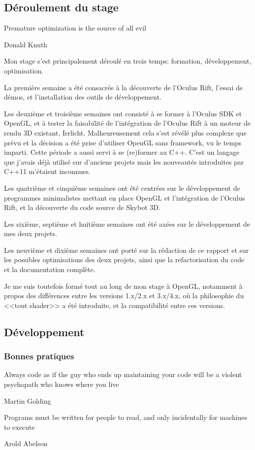 \documentclass[a4paper,french,12pt]{article}
\begin{document}
	\subsection{Déroulement du stage}

	   \epigraph{Premature optimization is the source of all evil}{Donald Knuth}

		Mon stage s'est principalement déroulé en trois temps: formation, développement, optimisation.

		La première semaine a été consacrée à la découverte de l'Oculus Rift, l'essai de démos, et l'installation
		des outils de développement.

		Les deuxième et troisième semaines ont consisté à se former à l'Oculus SDK et OpenGL, et à tester la
		faisabilité de l'intégration de l'Oculus Rift à un moteur de rendu 3D existant, Irrlicht. Malheureusement
		cela s'est révélé plus complexe que prévu et la décision a été prise d'utiliser OpenGL sans framework,
		vu le temps imparti.
		Cette période a aussi servi à se (re)former au C++. C'est un langage que j'avais déjà utilisé sur d'anciens
		projets mais les nouveautés introduites par C++11 m'étaient inconnues.

		Les quatrième et cinquième semaines ont été centrées sur le développement de programmes minimalistes mettant
		en place OpenGL et l'intégration de l'Oculus Rift, et la découverte du code source de Skybot 3D.

		Les sixième, septième et huitième semaines ont été axées sur le développement de mes deux projets.

		Les neuvième et dixième semaines ont porté sur la rédaction de ce rapport et sur les possibles optimisations
		des deux projets, ainsi que la refactorisation du code et la documentation complète.

		Je me suis toutefois formé tout au long de mon stage à OpenGL, notamment à propos
		des différences entre les versions 1.x/2.x et 3.x/4.x, où la philosophie du <<tout shader>> a été introduite,
		et la compatibilité entre ces versions.



	\subsection{Développement}

	  \subsubsection{Bonnes pratiques}
	    \epigraph{Always code as if the guy who ends up maintaining your code will be a violent psychopath who knows where you live}{Martin Golding}
	    \epigraph{Programs must be written for people to read, and only incidentally for machines to execute}{Arold Abelson}
\end{document}
